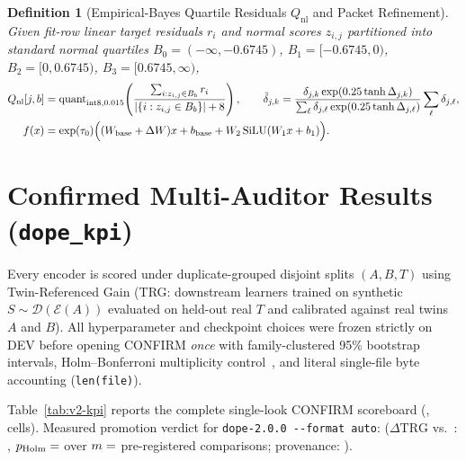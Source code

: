 \documentclass[10pt,letterpaper]{article}
\newtheorem{definition}{Definition}
\begin{document}
\begin{definition}[Empirical-Bayes Quartile Residuals $Q_{\mathrm{nl}}$ and Packet Refinement]
Given fit-row linear target residuals $r_i$ and normal scores $z_{i,j}$ partitioned into standard normal quartiles $B_0=(-\infty,-0.6745)$, $B_1=[-0.6745,0)$, $B_2=[0,0.6745)$, $B_3=[0.6745,\infty)$,
\begin{align}
  Q_{\mathrm{nl}}[j, b] &= \operatorname{quant}_{\mathrm{int8},0.015}\!\left(\frac{\sum_{i:z_{i,j}\in B_b} r_i}{|\{i:z_{i,j}\in B_b\}| + 8}\right),
  \qquad
  \tilde{\delta}_{j,k} = \frac{\delta_{j,k}\exp(0.25\tanh\Delta_{j,k})}{\sum_\ell \delta_{j,\ell}\exp(0.25\tanh\Delta_{j,\ell})}\sum_\ell \delta_{j,\ell}, \\
  f(x) &= \exp(\tau_0)\Bigl((W_{\mathrm{base}}+\Delta W)x + b_{\mathrm{base}} + W_2\,\mathrm{SiLU}(W_1 x + b_1)\Bigr).
\end{align}
\end{definition}

\section{Confirmed Multi-Auditor Results (\texttt{dope\_kpi})}
Every encoder is scored under duplicate-grouped disjoint splits $(A, B, T)$ using Twin-Referenced Gain (TRG: downstream learners trained on synthetic $S\sim\mathcal{D}(\mathcal{E}(A))$ evaluated on held-out real $T$ and calibrated against real twins $A$ and $B$).
All hyperparameter and checkpoint choices were frozen strictly on DEV before opening CONFIRM \emph{once} with family-clustered 95\% bootstrap intervals, Holm--Bonferroni multiplicity control~\citep{holm1979simple}, and literal single-file byte accounting (\texttt{len(file)}).

Table~\ref{tab:v2-kpi} reports the complete single-look CONFIRM scoreboard (\texttt{},  cells).
Measured promotion verdict for \texttt{dope-2.0.0 -{}-format auto}: \textbf{} ($\Delta\text{TRG}$ vs.\ \texttt{}: , $p_{\mathrm{Holm}} = \VTwo{KpiAutoPHolm}$ over $m = \VTwo{KpiHolmM}$ pre-registered comparisons; provenance: \texttt{}).
\end{document}
